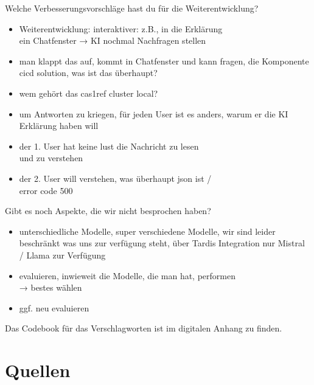 \documentclass[
  a4paper,
  12pt,
  oneside,
  open=any,
  BCOR=12mm,
  DIV=14,
  parskip=half*,
  headsepline,
  footsepline,
  pointlessnumbers,
  liststotoc,
  numbers=noenddot,
  listof=totoc]{scrartcl}
\providecommand{\tightlist}{%
  \setlength{\itemsep}{0pt}\setlength{\parskip}{0pt}}\usepackage{longtable,booktabs,array}
\begin{document}
Welche Verbesserungsvorschläge hast du für die Weiterentwicklung?

\begin{itemize}
\tightlist
\item
  Weiterentwicklung: interaktiver: z.B., in die Erklärung\\
  ein Chatfenster → KI nochmal Nachfragen stellen
\item
  man klappt das auf, kommt in Chatfenster und kann fragen, die
  Komponente cicd solution, was ist das überhaupt?
\item
  wem gehört das cas1ref cluster local?
\item
  um Antworten zu kriegen, für jeden User ist es anders, warum er die KI
  Erklärung haben will
\item
  der 1. User hat keine lust die Nachricht zu lesen\\
  und zu verstehen
\item
  der 2. User will verstehen, was überhaupt json ist /\\
  error code 500
\end{itemize}

Gibt es noch Aspekte, die wir nicht besprochen haben?

\begin{itemize}
\tightlist
\item
  unterschiedliche Modelle, super verschiedene Modelle, wir sind leider
  beschränkt was uns zur verfügung steht, über Tardis Integration nur
  Mistral / Llama zur Verfügung
\item
  evaluieren, inwieweit die Modelle, die man hat, performen\\
  → bestes wählen
\item
  ggf. neu evaluieren
\end{itemize}

Das Codebook für das Verschlagworten ist im digitalen Anhang zu finden.

\section{Quellen}\label{quellen}
\end{document}
